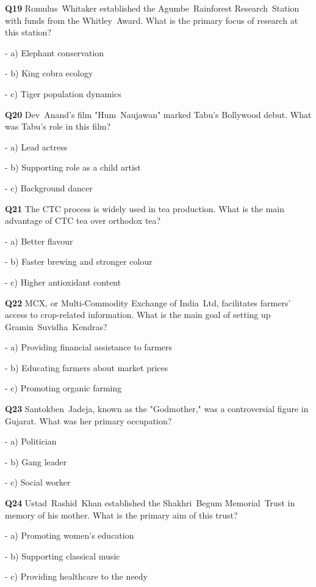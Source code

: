 \textbf{Q19} Romulus Whitaker established the Agumbe Rainforest Research Station with funds from the Whitley Award. What is the primary focus of research at this station?\par
\quad - a) Elephant conservation\par
\quad - b) King cobra ecology\par
\quad - c) Tiger population dynamics\par

\textbf{Q20} Dev Anand's film "Hum Naujawan" marked Tabu's Bollywood debut. What was Tabu's role in this film?\par
\quad - a) Lead actress\par
\quad - b) Supporting role as a child artist\par
\quad - c) Background dancer\par

\textbf{Q21} The CTC process is widely used in tea production. What is the main advantage of CTC tea over orthodox tea?\par
\quad - a) Better flavour\par
\quad - b) Faster brewing and stronger colour\par
\quad - c) Higher antioxidant content\par

\textbf{Q22} MCX, or Multi‑Commodity Exchange of India Ltd, facilitates farmers' access to crop‑related information. What is the main goal of setting up Gramin Suvidha Kendras?\par
\quad - a) Providing financial assistance to farmers\par
\quad - b) Educating farmers about market prices\par
\quad - c) Promoting organic farming\par

\textbf{Q23} Santokben Jadeja, known as the "Godmother," was a controversial figure in Gujarat. What was her primary occupation?\par
\quad - a) Politician\par
\quad - b) Gang leader\par
\quad - c) Social worker\par

\textbf{Q24} Ustad Rashid Khan established the Shakhri Begum Memorial Trust in memory of his mother. What is the primary aim of this trust?\par
\quad - a) Promoting women's education\par
\quad - b) Supporting classical music\par
\quad - c) Providing healthcare to the needy\par

